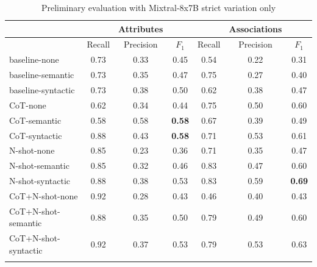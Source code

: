 \begin{table}[!h]
    \scriptsize
    \centering
    \setlength{\tabcolsep}{0.5em}
    \begin{tabular}{lcccccc}
    \toprule
         & & Attributes & & & Associations & \\
     \toprule
         & Recall & Precision & $F_1$ & Recall & Precision & $F_1$ \\
    \toprule
    
    \addlinespace
         baseline-none        & 0.73 & 0.33 & 0.45 & 0.54 & 0.22 & 0.31 \\
    	 baseline-semantic    & 0.73 & 0.35 & 0.47 & 0.75 & 0.27 & 0.40 \\
         baseline-syntactic   & 0.73 & 0.38 & 0.50 & 0.62 & 0.38 & 0.47 \\
         CoT-none             & 0.62 & 0.34 & 0.44 & 0.75 & 0.50 & 0.60 \\
         CoT-semantic         & 0.58 & 0.58 & \textbf{0.58} & 0.67 & 0.39 & 0.49 \\
         CoT-syntactic        & 0.88 & 0.43 & \textbf{0.58} & 0.71 & 0.53 & 0.61 \\
         N-shot-none          & 0.85 & 0.23 & 0.36 & 0.71 & 0.35 & 0.47 \\
         N-shot-semantic      & 0.85 & 0.32 & 0.46 & 0.83 & 0.47 & 0.60 \\
         N-shot-syntactic     & 0.88 & 0.38 & 0.53 & 0.83 & 0.59 & \textbf{0.69} \\
         CoT+N-shot-none      & 0.92 & 0.28 & 0.43 & 0.46 & 0.40 & 0.43 \\
         CoT+N-shot-semantic  & 0.88 & 0.35 & 0.50 & 0.79 & 0.49 & 0.60 \\
         CoT+N-shot-syntactic & 0.92 & 0.37 & 0.53 & 0.79 & 0.53 & 0.63 \\
    \addlinespace
    \bottomrule
    \addlinespace
    \end{tabular}
    \caption{Preliminary evaluation with Mixtral-8x7B strict variation only}
    \label{tab:preliminary-mixtral}
\end{table}


